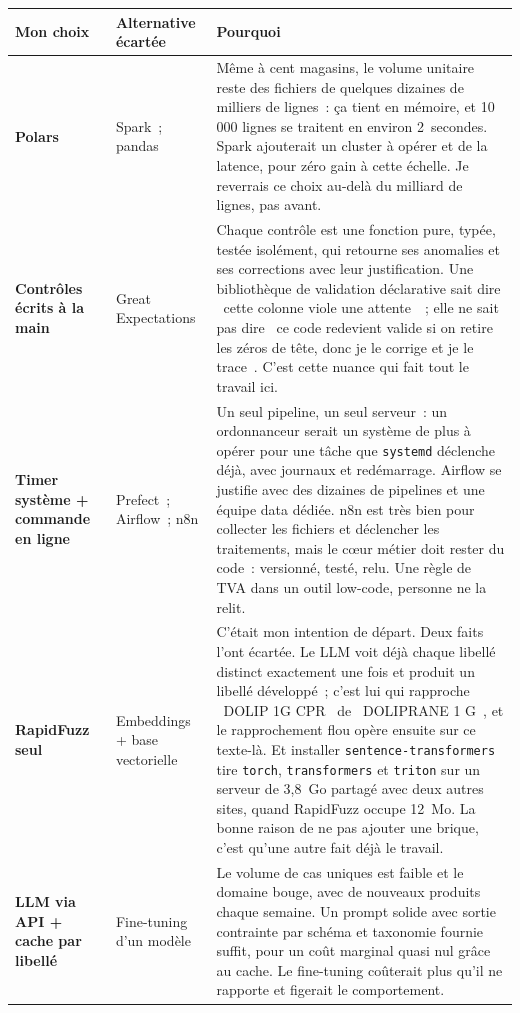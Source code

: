 \documentclass[11pt,a4paper]{article}
\newcommand{\code}[1]{\texttt{\small #1}}
\newcommand{\gui}[1]{\guillemotleft{}~#1~\guillemotright{}}
\begin{document}
\renewcommand{\arraystretch}{1.22}%
\noindent\small\begin{tabularx}{\linewidth}{@{}>{\raggedright\arraybackslash\bfseries}p{3.0cm} >{\raggedright\arraybackslash}p{3.2cm} X@{}}
\toprule
\textbf{Mon choix} & \textbf{Alternative écartée} & \textbf{Pourquoi} \\
\midrule
Polars & Spark~; pandas & Même à cent magasins, le volume unitaire reste des fichiers de quelques dizaines de milliers de lignes~: ça tient en mémoire, et 10\,000 lignes se traitent en environ 2~secondes. Spark ajouterait un cluster à opérer et de la latence, pour zéro gain à cette échelle. Je reverrais ce choix au-delà du milliard de lignes, pas avant. \\
Contrôles écrits à la main & Great Expectations & Chaque contrôle est une fonction pure, typée, testée isolément, qui retourne ses anomalies et ses corrections avec leur justification. Une bibliothèque de validation déclarative sait dire \gui{cette colonne viole une attente}~; elle ne sait pas dire \gui{ce code redevient valide si on retire les zéros de tête, donc je le corrige et je le trace}. C'est cette nuance qui fait tout le travail ici. \\
Timer système + commande en ligne & Prefect~; Airflow~; n8n & Un seul pipeline, un seul serveur~: un ordonnanceur serait un système de plus à opérer pour une tâche que \code{systemd} déclenche déjà, avec journaux et redémarrage. Airflow se justifie avec des dizaines de pipelines et une équipe data dédiée. n8n est très bien pour collecter les fichiers et déclencher les traitements, mais le c\oe{}ur métier doit rester du code~: versionné, testé, relu. Une règle de TVA dans un outil low-code, personne ne la relit. \\
RapidFuzz seul & Embeddings + base vectorielle & C'était mon intention de départ. Deux faits l'ont écartée. Le LLM voit déjà chaque libellé distinct exactement une fois et produit un libellé développé~; c'est lui qui rapproche \gui{DOLIP 1G CPR} de \gui{DOLIPRANE 1 G}, et le rapprochement flou opère ensuite sur ce texte-là. Et installer \code{sentence-transformers} tire \code{torch}, \code{transformers} et \code{triton} sur un serveur de 3,8~Go partagé avec deux autres sites, quand RapidFuzz occupe 12~Mo. La bonne raison de ne pas ajouter une brique, c'est qu'une autre fait déjà le travail. \\
LLM via API + cache par libellé & Fine-tuning d'un modèle & Le volume de cas uniques est faible et le domaine bouge, avec de nouveaux produits chaque semaine. Un prompt solide avec sortie contrainte par schéma et taxonomie fournie suffit, pour un coût marginal quasi nul grâce au cache. Le fine-tuning coûterait plus qu'il ne rapporte et figerait le comportement. \\

\end{tabularx}
\end{document}
